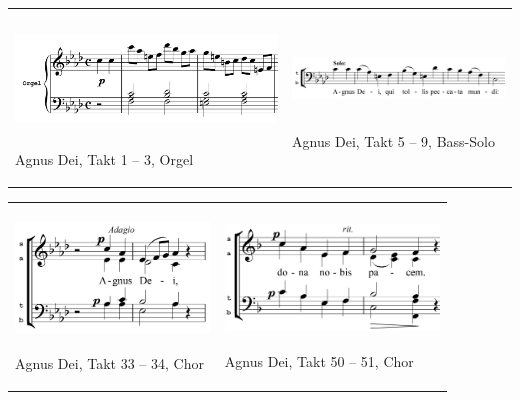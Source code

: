 \begin{flushleft}
\tablefirsthead{}
\tablehead{}
\tabletail{}
\tablelasttail{}
\begin{supertabular}{m{7.676cm}m{6.372cm}}
\begin{figure}
\img{}
\caption{}
\end{figure}
\includegraphics[width=7.493cm,height=2.828cm]{pictures/zulassungsarbeit-img115.png}

Agnus Dei, Takt 1 – 3, Orgel &
\begin{figure}
\img{}
\caption{}
\end{figure}
\includegraphics[width=6.018cm,height=1.85cm]{pictures/zulassungsarbeit-img116.png}
\begin{figure}
\img{}
\caption{}
\end{figure}
Agnus Dei, Takt 5 – 9, Bass-Solo\\
\end{supertabular}
\end{flushleft}
\begin{flushleft}
\tablefirsthead{}
\tablehead{}
\tabletail{}
\tablelasttail{}
\begin{supertabular}{m{5.3650002cm}m{5.875cm}}

\includegraphics[width=5.182cm,height=3.087cm]{pictures/zulassungsarbeit-img117.png}
\begin{figure}
\img{}
\caption{}
\end{figure}
Agnus Dei, Takt 33 – 34, Chor &
\begin{figure}
\img{}
\caption{}
\end{figure}
\includegraphics[width=5.692cm,height=2.972cm]{pictures/zulassungsarbeit-img118.png}

Agnus Dei, Takt 50 – 51, Chor\\
\end{supertabular}
\end{flushleft}
